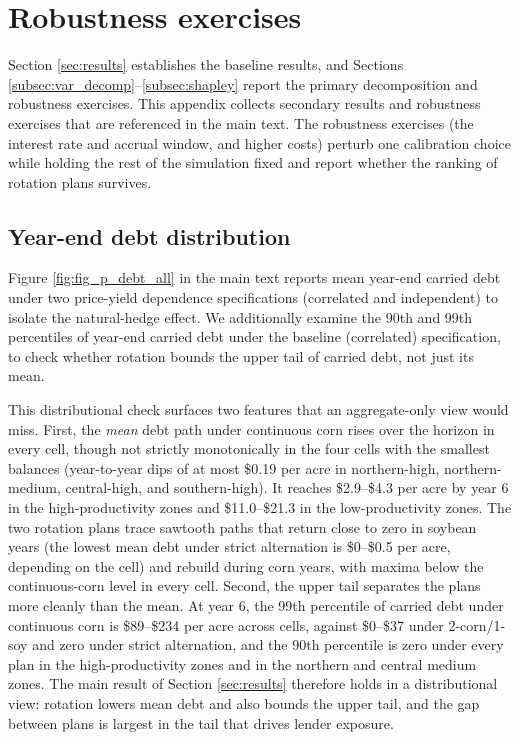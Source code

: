 \documentclass[11pt,letterpaper]{article}
\theoremstyle{remark}
\begin{document}
\section{\label{sec:appendix_B}Robustness exercises}

Section \ref{sec:results} establishes the baseline results, and Sections \ref{subsec:var_decomp}--\ref{subsec:shapley} report the primary decomposition and robustness exercises. This appendix collects secondary results and robustness exercises that are referenced in the main text. The robustness exercises (the interest rate and accrual window, and higher costs) perturb one calibration choice while holding the rest of the simulation fixed and report whether the ranking of rotation plans survives.

\subsection{\label{subsec:end_debt}Year-end debt distribution}
Figure \ref{fig:fig_p_debt_all} in the main text reports mean year-end carried debt under two price-yield dependence specifications (correlated and independent) to isolate the natural-hedge effect. We additionally examine the 90th and 99th percentiles of year-end carried debt under the baseline (correlated) specification, to check whether rotation bounds the upper tail of carried debt, not just its mean.

This distributional check surfaces two features that an aggregate-only view would miss. First, the \textit{mean} debt path under continuous corn rises over the horizon in every cell, though not strictly monotonically in the four cells with the smallest balances (year-to-year dips of at most \$0.19 per acre in northern-high, northern-medium, central-high, and southern-high). It reaches \$2.9--\$4.3 per acre by year 6 in the high-productivity zones and \$11.0--\$21.3 in the low-productivity zones. The two rotation plans trace sawtooth paths that return close to zero in soybean years (the lowest mean debt under strict alternation is \$0--\$0.5 per acre, depending on the cell) and rebuild during corn years, with maxima below the continuous-corn level in every cell. Second, the upper tail separates the plans more cleanly than the mean. At year 6, the 99th percentile of carried debt under continuous corn is \$89--\$234 per acre across cells, against \$0--\$37 under 2-corn/1-soy and zero under strict alternation, and the 90th percentile is zero under every plan in the high-productivity zones and in the northern and central medium zones. The main result of Section \ref{sec:results} therefore holds in a distributional view: rotation lowers mean debt and also bounds the upper tail, and the gap between plans is largest in the tail that drives lender exposure.
\end{document}
